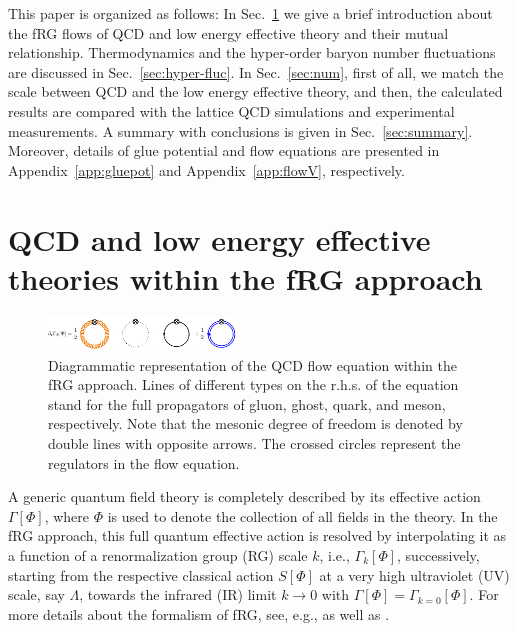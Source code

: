 \documentclass[%
reprint,
superscriptaddress,
showpacs,preprintnumbers,
 amsmath,amssymb,
 aps,
prd,
]{revtex4-1}
\def\sec#1{Sec.~\ref{#1}}
\def\app#1{Appendix~\ref{#1}}
\begin{document}
This paper is organized as follows: In \sec{sec:FRG} we give a brief introduction about the fRG flows of QCD and low energy effective theory and their mutual relationship. Thermodynamics and the hyper-order baryon number fluctuations are discussed in \sec{sec:hyper-fluc}. In \sec{sec:num}, first of all, we match the scale between QCD and the low energy effective theory, and then, the calculated results are compared with the lattice QCD simulations and experimental measurements. A summary with conclusions is given in \sec{sec:summary}. Moreover, details of glue potential and flow equations are presented in \app{app:gluepot} and \app{app:flowV}, respectively.





\section{QCD and low energy effective theories within the fRG approach}
\label{sec:FRG}

%
\begin{figure}[t]
\includegraphics[width=0.45\textwidth]{QCD_equation}
\caption{Diagrammatic representation of the QCD flow equation within the fRG approach. Lines of different types on the r.h.s. of the equation stand for the full propagators of gluon, ghost, quark, and meson, respectively. Note that the mesonic degree of freedom is denoted by double lines with opposite arrows. The crossed circles represent the regulators in the flow equation.}\label{fig:QCD_equation}
\end{figure}
%

A generic quantum field theory is completely described by its effective action $\Gamma[\Phi]$, where $\Phi$ is used to denote the collection of all fields in the theory. In the fRG approach, this full quantum effective action is resolved by  
interpolating it as a function of a renormalization group (RG) scale $k$, i.e., $\Gamma_k[\Phi]$, successively, starting from the respective classical action $S[\Phi]$ at a very high ultraviolet (UV) scale, say $\Lambda$, towards the infrared (IR) limit $k\rightarrow 0$ with $\Gamma[\Phi]=\Gamma_{k=0}[\Phi]$. For more details about the formalism of fRG, see, e.g., \cite{Wetterich:1992yh} as well as \cite{Ellwanger:1993mw,Morris:1993qb}. 
\end{document}
